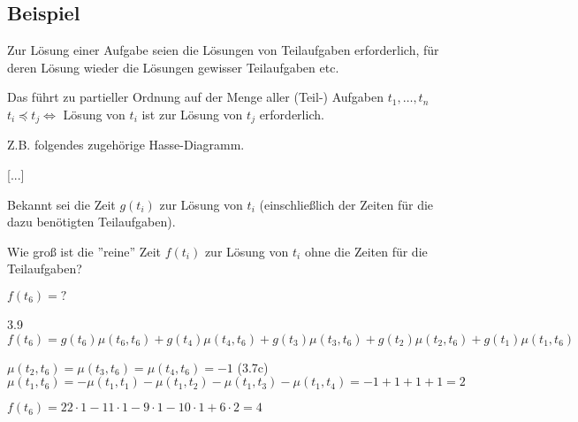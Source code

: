 \begin{enumerate}
	\subsection{Beispiel} %
	
	Zur Lösung einer Aufgabe seien die Lösungen von Teilaufgaben erforderlich, für deren Lösung wieder die Lösungen gewisser Teilaufgaben etc.
	
	Das führt zu partieller Ordnung auf der Menge aller (Teil-) Aufgaben $t_1, \dots, t_n$
	\\ $t_i \preceq t_j \Leftrightarrow$ Lösung von $t_i$ ist zur Lösung von $t_j$ erforderlich.
	
	Z.B. folgendes zugehörige Hasse-Diagramm.
	
	[...]
	
	Bekannt sei die Zeit $g(t_i)$ zur Lösung von $t_i$ (einschließlich der Zeiten für die dazu benötigten Teilaufgaben).
	
	Wie groß ist die ''reine'' Zeit $f(t_i)$ zur Lösung von $t_i$ ohne die Zeiten für die Teilaufgaben?
	
	$f(t_6) = ?$
	
	3.9 %
	$f(t_6) = g(t_6)\mu(t_6, t_6)
		+ g(t_4)\mu(t_4, t_6) 
		+ g(t_3)\mu(t_3, t_6)
		+ g(t_2)\mu(t_2, t_6)
		+ g(t_1)\mu(t_1, t_6) $
		
	$\mu(t_2, t_6) = \mu(t_3, t_6) = \mu(t_4, t_6) = -1$ (3.7c) %
	\\$\mu(t_1, t_6) = -\mu(t_1, t_1) - \mu(t_1, t_2) - \mu(t_1, t_3) - \mu(t_1, t_4) = -1 + 1 + 1 +1 = 2$
	
	$f(t_6) = 22 \cdot 1 - 11 \cdot 1 - 9 \cdot 1 - 10 \cdot 1 + 6 \cdot 2 = 4$	
	
	
	
	
	
	
	
	
	
	
	
		
		
		
		
		
		
		
		
		
		
		
		
		
		
		
\end{enumerate}